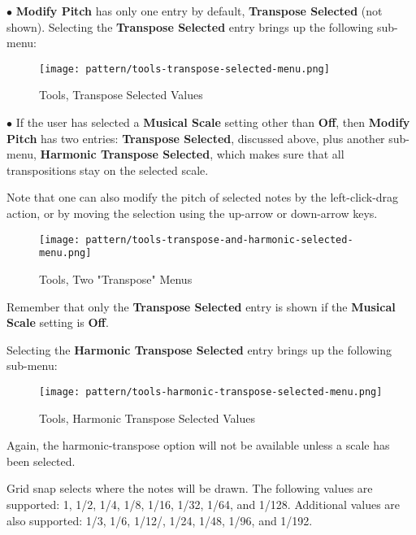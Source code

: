    $\bullet$ \textbf{Modify Pitch} has only one entry by default,
   \textbf{Transpose Selected} (not shown).
   Selecting the \textbf{Transpose Selected} entry
   brings up the following sub-menu:

\begin{figure}[H]
   \centering 
   \texttt{[image: pattern/tools-transpose-selected-menu.png]}
   \caption{Tools, Transpose Selected Values}
   \label{fig:pattern_editor_tools_transpose_selected_menu}
\end{figure}

   $\bullet$ If the user has selected a
   \textbf{Musical Scale} setting other than \textbf{Off},
   then \textbf{Modify Pitch} has two entries:
   \textbf{Transpose Selected}, discussed above, plus
   another sub-menu,
   \textbf{Harmonic Transpose Selected}, which makes sure that all
   transpositions stay on the selected scale.

   Note that one can also modify the pitch of selected notes by the
   left-click-drag action, or by moving the selection using the
   up-arrow or down-arrow keys.

\begin{figure}[H]
   \centering 
   \texttt{[image: pattern/tools-transpose-and-harmonic-selected-menu.png]}
   \caption{Tools, Two "Transpose" Menus}
   \label{fig:pattern_editor_tools_two_transpose_menus}
\end{figure}

   Remember that only the \textbf{Transpose Selected} entry is shown if the
   \textbf{Musical Scale} setting is \textbf{Off}.

   Selecting the \textbf{Harmonic Transpose Selected} entry brings up the
   following sub-menu:

\begin{figure}[H]
   \centering 
   \texttt{[image: pattern/tools-harmonic-transpose-selected-menu.png]}
   \caption{Tools, Harmonic Transpose Selected Values}
   \label{fig:pattern_editor_tools_harmonic_transpose_menu}
\end{figure}

   Again, the harmonic-transpose option will not be available unless a scale
   has been selected.

   Grid snap selects where the notes will be drawn.
   The following values are supported:
   1, 1/2, 1/4, 1/8, 1/16, 1/32, 1/64, and 1/128.
   Additional values are also supported:
   1/3, 1/6, 1/12/, 1/24, 1/48, 1/96, and 1/192.

